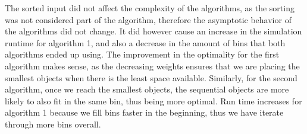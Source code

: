 \documentclass[11pt]{article}
\begin{document}
\begin{multicols}{2}
\begin{figure}[H]
	\end{figure}
	The sorted input did not affect the complexity of the algorithms, as the sorting was
	not considered part of the algorithm, therefore the asymptotic behavior of the algorithms did not change. It did however cause an increase in the simulation
	runtime for algorithm 1, and also a decrease in the amount of bins that both algorithms ended up using. The
	improvement in the optimality for the first algorithm makes sense, as the decreasing weights
	ensures that we are placing the smallest objects when there is the least space available.
	Similarly, for the second algorithm, once we reach the smallest objects, the sequential objects
	are more likely to also fit in the same bin, thus being more optimal. Run time increases for
	algorithm 1 because we fill bins faster in the beginning, thus we have iterate through more bins
	overall.





\end{multicols}
\end{document}
